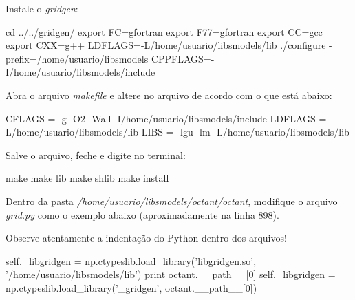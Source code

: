 \noindent Instale o \textit{gridgen}:
\bigskip
\begin{bashcode}[fontsize=\scriptsize]
cd ../../gridgen/
export FC=gfortran
export F77=gfortran
export CC=gcc
export CXX=g++
LDFLAGS=-L/home/usuario/libsmodels/lib
./configure -prefix=/home/usuario/libsmodels CPPFLAGS=-I/home/usuario/libsmodels/include
\end{bashcode}
\bigskip

\noindent Abra o arquivo \textit{makefile} e altere no arquivo de acordo com o que está abaixo:
\bigskip

\begin{bashcode}
CFLAGS = -g -O2 -Wall -I/home/usuario/libsmodels/include
LDFLAGS = -L/home/usuario/libsmodels/lib
LIBS = -lgu -lm -L/home/usuario/libsmodels/lib
\end{bashcode}
\bigskip

\noindent Salve o arquivo, feche e digite no terminal:
\bigskip

\begin{bashcode}
make
make lib
make shlib
make install
\end{bashcode}
\bigskip

\noindent Dentro da pasta \textit{/home/usuario/libsmodels/octant/octant}, modifique o arquivo \textit{grid.py} como o exemplo abaixo (aproximadamente na linha 898).
\bigskip

\begin{tcolorbox}[enhanced,
  grow to left by=0cm,%
  grow to right by=0cm,%
  enlarge top by=0cm,%
  enlarge bottom by=0cm,%
  tcbox raise base,
  boxrule=1.0pt,
  left=18mm,
  colframe=red!50!black,coltext=red!25!black,colback=red!10!white,
  overlay={\begin{tcbclipinterior}\fill[red!75!blue!50!white] (frame.south west)
    rectangle node[text=white,font=\sffamily\bfseries\footnotesize,rotate=0] {ATENÇÃO} ([xshift=18mm]frame.north west);\end{tcbclipinterior}}]
Observe atentamente a indentação do Python dentro dos arquivos!
\end{tcolorbox}
\bigskip


\begin{bashcode}[fontsize=\footnotesize]
self._libgridgen = np.ctypeslib.load_library('libgridgen.so', '/home/usuario/libsmodels/lib')
print octant.__path__[0]
self._libgridgen = np.ctypeslib.load_library('_gridgen', octant.__path__[0])
\end{bashcode}
\bigskip

